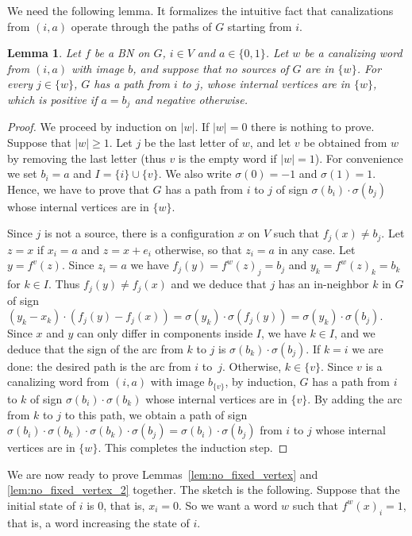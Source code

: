 \documentclass[11pt,letter]{article}
\newtheorem{lemma}{Lemma}
\newcommand{\B}{\{0,1\}}
\begin{document}
We need the following lemma. It formalizes the intuitive fact that canalizations from $(i,a)$ operate through the paths of $G$ starting from $i$. 

\begin{lemma}\label{lem:diffusion}
Let $f$ be a BN on $G$, $i\in V$ and $a\in\B$. Let $w$ be a canalizing word from $(i,a)$ with image $b$, and suppose that no sources of $G$ are in $\{w\}$. For every $j\in\{w\}$, $G$ has a path from $i$ to $j$, whose internal vertices are in $\{w\}$, which is positive if $a=b_j$ and negative otherwise. 
\end{lemma}

\begin{proof}
We proceed by induction on $|w|$. If $|w|=0$ there is nothing to prove. Suppose that $|w|\geq 1$. Let $j$ be the last letter of $w$, and let $v$ be obtained from $w$ by removing the last letter (thus $v$ is the empty word if $|w|=1$). For convenience we set $b_i=a$ and $I=\{i\}\cup \{v\}$. We also write $\sigma(0)=-1$ and $\sigma(1)=1$. Hence, we have to prove that $G$ has a path from $i$ to $j$ of sign $\sigma(b_i)\cdot\sigma(b_j)$ whose internal vertices are in $\{w\}$. 

\medskip
Since $j$ is not a source, there is a configuration $x$ on $V$ such that $f_j(x)\neq b_j$. Let $z=x$ if $x_i=a$ and $z=x+e_i$ otherwise, so that $z_i=a$ in any case. Let $y=f^v(z)$. Since $z_i=a$ we have $f_j(y)=f^w(z)_j=b_j$ and $y_k=f^w(z)_k=b_k$ for $k\in I$. Thus $f_j(y)\neq f_j(x)$ and we deduce that $j$ has an in-neighbor $k$ in $G$ of sign $(y_k-x_k)\cdot (f_j(y)-f_j(x))=\sigma(y_k)\cdot \sigma(f_j(y))=\sigma(y_k)\cdot \sigma(b_j)$. Since $x$ and $y$ can only differ in components inside $I$, we have $k\in I$, and we deduce that the sign of the arc from $k$ to $j$ is $\sigma(b_k)\cdot \sigma(b_j)$. If $k=i$ we are done: the desired path is the arc from $i$ to~$j$. Otherwise, $k\in\{v\}$. Since $v$ is a canalizing word from $(i,a)$ with image $b_{\{v\}}$, by induction, $G$ has a path from $i$ to $k$ of sign $\sigma(b_i)\cdot \sigma(b_k)$ whose internal vertices are in $\{v\}$. By adding the arc from $k$ to $j$ to this path, we obtain a path of sign $\sigma(b_i)\cdot \sigma(b_k)\cdot \sigma(b_k)\cdot \sigma(b_j)=\sigma(b_i)\cdot \sigma(b_j)$  from $i$ to $j$ whose internal vertices are in $\{w\}$. This completes the induction step.   
\end{proof}

We are now ready to prove Lemmas~\ref{lem:no_fixed_vertex} and \ref{lem:no_fixed_vertex_2} together. The sketch is the following. Suppose that the initial state of $i$ is $0$, that is, $x_i=0$. So we want a word $w$ such that $f^w(x)_i=1$, that is, a word increasing the state of $i$. 
\end{document}
